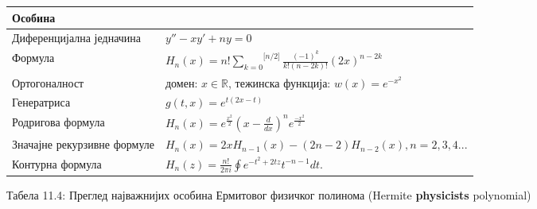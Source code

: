 {\def\LTcaptype{none} %
\begin{longtable}[]{@{}
  >{\raggedright\arraybackslash}p{}
  >{\centering\arraybackslash}p{}@{}}
\toprule\noalign{}
\begin{minipage}[b]{\linewidth}\raggedright
Особина
\end{minipage} & \begin{minipage}[b]{\linewidth}\centering
\end{minipage} \\
\midrule\noalign{}
\endhead
\bottomrule\noalign{}
\endlastfoot
Диференцијална једначина & \(y'' - xy' + ny = 0\) \\
Формула &
\(H_{n}(x) = n!\overset{\lbrack n/2\rbrack}{\sum_{k = 0}}\frac{{( - 1)}^{k}}{k!(n - 2k)!}{(2x)}^{n - 2k}\) \\
Ортогоналност & домен: \(x\mathbb{\in R}\), тежинска функција:
\(w(x) = e^{- x^{2}}\) \\
Генератриса & \(g(t,x) = e^{t(2x - t)}\) \\
Родригова формула &
\(H_{n}(x) = e^{\frac{x^{2}}{2}}{(x - \frac{d}{dx})}^{n}e^{\frac{- x^{2}}{2}}\) \\
Значајне рекурзивне формуле &
\(H_{n}(x) = 2xH_{n - 1}(x) - (2n - 2)H_{n - 2}(x),n = 2,3,4...\) \\
Контурна формула &
\(H_{n}(z) = \frac{n!}{2\pi i}\oint e^{- t^{2} + 2tz}t^{- n - 1}dt\). \\
\end{longtable}
}

Табела 11.4: Преглед најважнијих особина Ермитовог физичког полинома
(Hermite \textbf{physicist\textquotesingle s} polynomial)


